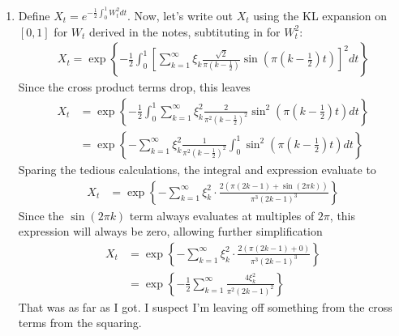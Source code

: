 \documentclass[12pt]{article}
\theoremstyle{plain}
\theoremstyle{definition}
\theoremstyle{remark}
\begin{document}
\begin{enumerate}
\begin{enumerate}
    \end{enumerate}

  \item %
    Define $X_t = e^{-\frac{1}{2}\int^1_0 W_t^2 dt}$. Now, let's write
    out $X_t$ using the KL expansion on $[0,1]$ for $W_t$ derived in the
    notes, subtituting in for $W^2_t$:
    \begin{align*}
      X_t = \exp\left\{
        -\frac{1}{2}\int^1_0
        \left[
        \sum^\infty_{k=1}\xi_k \frac{\sqrt{2}}{\pi\left(k-\frac{1}{2}\right)}
        \sin\left(\pi\left(k-\frac{1}{2}\right)t\right)
        \right]^2 dt
      \right\}
    \end{align*}
    Since the cross product terms drop, this leaves
    \begin{align*}
      X_t
      &= \exp\left\{
        -\frac{1}{2}\int^1_0
        \sum^\infty_{k=1}\xi^2_k \frac{2}{\pi^2\left(k-\frac{1}{2}\right)^2}
        \sin^2\left(\pi\left(k-\frac{1}{2}\right)t\right) dt
      \right\}\\
      &= \exp\left\{
        -\sum^\infty_{k=1}
        \xi^2_k \frac{1}{\pi^2\left(k-\frac{1}{2}\right)^2}\int^1_0
        \sin^2\left(\pi\left(k-\frac{1}{2}\right)t\right) dt
      \right\}
    \end{align*}
    Sparing the tedious calculations, the integral and expression
    evaluate to
    \begin{align*}
      X_t
      &= \exp\left\{
        -\sum^\infty_{k=1}\xi_k^2\cdot
        \frac{2(\pi(2k-1) + \sin(2\pi k) )}{\pi^3(2k-1)^3}
      \right\}
    \end{align*}
    Since the $\sin(2\pi k)$ term always evaluates at multiples of
    $2\pi$, this expression will always be zero, allowing further
    simplification
    \begin{align*}
      X_t
      &= \exp\left\{
        -\sum^\infty_{k=1}\xi_k^2\cdot
        \frac{2(\pi(2k-1) + 0 )}{\pi^3(2k-1)^3}
      \right\}\\
      &= \exp\left\{
        -\frac{1}{2}\sum^\infty_{k=1}
        \frac{4\xi_k^2}{\pi^2(2k-1)^2}
      \right\}
    \end{align*}
    That was as far as I got. I suspect I'm leaving off something from
    the cross terms from the squaring.


\end{enumerate}
\end{document}
